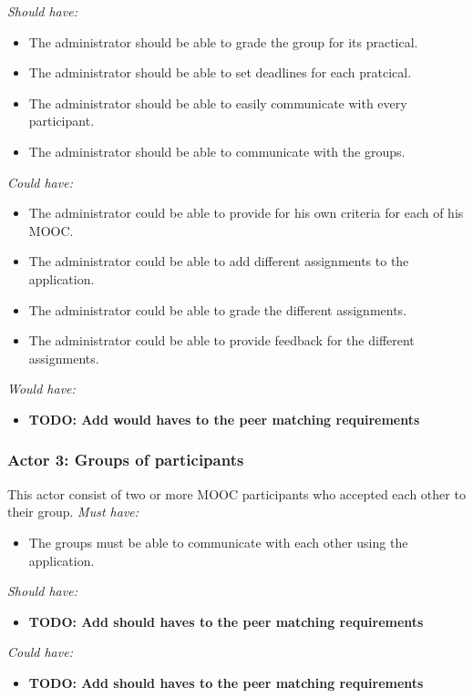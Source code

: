 \documentclass[]{article}
\newcommand{\TODO}[1]{{\color{red}\textbf{TODO: #1}}}
\begin{document}
\emph{Should have:}
\begin{itemize}
\item The administrator should be able to grade the group for its practical.
\item The administrator should be able	 to set deadlines for each pratcical.
\item The administrator should be able to easily communicate with every participant.
\item The administrator should be able to communicate with the groups.
\end{itemize}

\emph{Could have:}
\begin{itemize}
\item The administrator could be able to provide for his own criteria for each of his MOOC.
\item The administrator could be able to add different assignments to the application.
\item The administrator could be able to grade the different assignments.
\item The administrator could be able to provide feedback for the different assignments.
\end{itemize}

\emph{Would have:}
\begin{itemize}
\item \TODO{Add would haves to the peer matching requirements}
\end{itemize}

\subsubsection{Actor 3: Groups of participants}
This actor consist of two or more MOOC participants who accepted each other to their group.
\emph{Must have:}
\begin{itemize}
\item The groups must be able to communicate with each other using the application.
\end{itemize}

\emph{Should have:}
\begin{itemize}
\item \TODO{Add should haves to the peer matching requirements}
\end{itemize}

\emph{Could have:}
\begin{itemize}
\item \TODO{Add should haves to the peer matching requirements}
\end{itemize}
\end{document}

